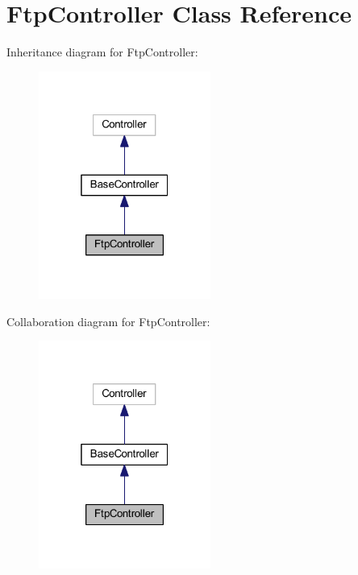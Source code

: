 \hypertarget{class_ftp_controller}{}\section{Ftp\+Controller Class Reference}
\label{class_ftp_controller}


Inheritance diagram for Ftp\+Controller\+:
\nopagebreak
\begin{figure}[H]
\begin{center}
\leavevmode
\includegraphics[width=160pt]{class_ftp_controller__inherit__graph}
\end{center}
\end{figure}


Collaboration diagram for Ftp\+Controller\+:
\nopagebreak
\begin{figure}[H]
\begin{center}
\leavevmode
\includegraphics[width=160pt]{class_ftp_controller__coll__graph}
\end{center}
\end{figure}
